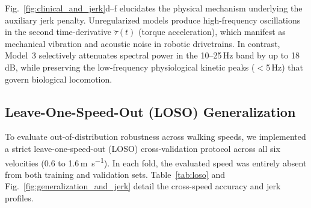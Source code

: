 \documentclass[fleqn,10pt]{wlscirep}
\begin{document}
Fig.~\ref{fig:clinical_and_jerk}d--f elucidates the physical mechanism underlying the auxiliary jerk penalty. Unregularized models produce high-frequency oscillations in the second time-derivative $\ddot{\tau}(t)$ (torque acceleration), which manifest as mechanical vibration and acoustic noise in robotic drivetrains. In contrast, Model~3 selectively attenuates spectral power in the 10--25\,Hz band by up to 18\,dB, while preserving the low-frequency physiological kinetic peaks ($<$5\,Hz) that govern biological locomotion.

\subsection{Leave-One-Speed-Out (LOSO) Generalization}

To evaluate out-of-distribution robustness across walking speeds, we implemented a strict leave-one-speed-out (LOSO) cross-validation protocol across all six velocities (0.6 to 1.6\,\si{\metre\per\second}). In each fold, the evaluated speed was entirely absent from both training and validation sets. Table~\ref{tab:loso} and Fig.~\ref{fig:generalization_and_jerk} detail the cross-speed accuracy and jerk profiles.
\end{document}
